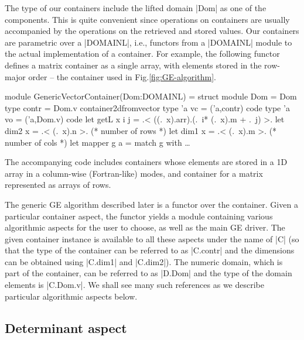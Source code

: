 \documentclass{elsart}
\begin{document}
The type of our containers include the lifted domain |Dom| as one of
the components. This is quite convenient since operations on containers
are usually accompanied by the operations on the retrieved and stored
values. Our containers are parametric over a |DOMAINL|, i.e., functors
from a |DOMAINL| module to the actual implementation of a
container. For example, the following functor defines a matrix
container as a single array, with elements stored in the
row-major order -- the container used in Fig.\ref{fig:GE-algorithm}.
\begin{code}[commandchars=\\\{\}]
module GenericVectorContainer(Dom:DOMAINL) =
  struct
  module Dom = Dom
  type contr = Dom.v container2dfromvector
  type 'a vc = ('a,contr) code
  type 'a vo = ('a,Dom.v) code
  let getL x i j = .< ((.~x).arr).(.~i* (.~x).m + .~j) >.
  let dim2 x = .< (.~x).n >.      (* number of rows *)
  let dim1 x = .< (.~x).m >.      (* number of cols *)
  let mapper g a = match g with
  \dots
\end{code}
%
The accompanying code \cite{metamonadsURL} includes containers whose
elements are stored in a 1D array in a column-wise (Fortran-like)
modes, and container for a matrix represented as arrays of rows.

The generic GE algorithm described later is a functor over the
container.  Given a particular container aspect, the functor yields a
module containing various algorithmic aspects for the user to choose,
as well as the main GE driver. The given container instance is
available to all these aspects under the name of |C| (so that the type
of the container can be referred to as |C.contr| and the dimensions
can be obtained using |C.dim1| and |C.dim2|). The numeric domain, which
is part of the container, can be referred to as |D.Dom| and the type
of the domain elements is |C.Dom.v|. We shall see many such references
as we describe particular algorithmic aspects below.


\subsection{Determinant aspect}
\label{sec:det}
\end{document}
